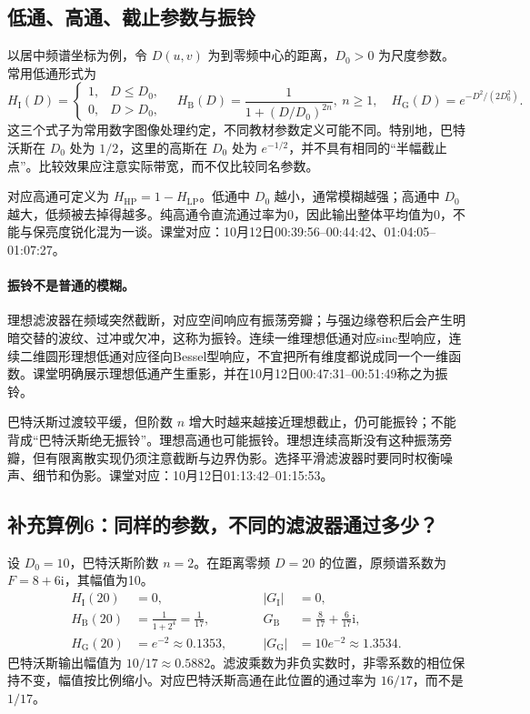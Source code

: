 \subsection{低通、高通、截止参数与振铃}
以居中频谱坐标为例，令 $D(u,v)$ 为到零频中心的距离，$D_0>0$ 为尺度参数。常用低通形式为
\[
H_{\mathrm I}(D)=\begin{cases}1,&D\leq D_0,\\0,&D>D_0,\end{cases}
\quad
H_{\mathrm B}(D)=\frac{1}{1+(D/D_0)^{2n}},\ n\geq1,
\quad
H_{\mathrm G}(D)=e^{-D^2/(2D_0^2)}.
\]
这三个式子为常用数字图像处理约定，不同教材参数定义可能不同。特别地，巴特沃斯在 $D_0$ 处为 $1/2$，这里的高斯在 $D_0$ 处为 $e^{-1/2}$，并不具有相同的“半幅截止点”。比较效果应注意实际带宽，而不仅比较同名参数。

对应高通可定义为 $H_{\mathrm{HP}}=1-H_{\mathrm{LP}}$。低通中 $D_0$ 越小，通常模糊越强；高通中 $D_0$ 越大，低频被去掉得越多。纯高通令直流通过率为0，因此输出整体平均值为0，不能与保亮度锐化混为一谈。课堂对应：10月12日00:39:56--00:44:42、01:04:05--01:07:27。

\paragraph{振铃不是普通的模糊。}
理想滤波器在频域突然截断，对应空间响应有振荡旁瓣；与强边缘卷积后会产生明暗交替的波纹、过冲或欠冲，这称为振铃。连续一维理想低通对应sinc型响应，连续二维圆形理想低通对应径向Bessel型响应，不宜把所有维度都说成同一个一维函数。课堂明确展示理想低通产生重影，并在10月12日00:47:31--00:51:49称之为振铃。

巴特沃斯过渡较平缓，但阶数 $n$ 增大时越来越接近理想截止，仍可能振铃；不能背成“巴特沃斯绝无振铃”。理想高通也可能振铃。理想连续高斯没有这种振荡旁瓣，但有限离散实现仍须注意截断与边界伪影。选择平滑滤波器时要同时权衡噪声、细节和伪影。课堂对应：10月12日01:13:42--01:15:53。

\subsection{补充算例6：同样的参数，不同的滤波器通过多少？}
设 $D_0=10$，巴特沃斯阶数 $n=2$。在距离零频 $D=20$ 的位置，原频谱系数为 $F=8+6\mathrm i$，其幅值为10。
\[
\begin{aligned}
H_{\mathrm I}(20)&=0,\qquad &|G_{\mathrm I}|&=0,\\
H_{\mathrm B}(20)&=\frac1{1+2^4}=\frac1{17},\qquad
& G_{\mathrm B}&=\frac8{17}+\frac6{17}\mathrm i,\\
H_{\mathrm G}(20)&=e^{-2}\approx0.1353,\qquad
& |G_{\mathrm G}|&=10e^{-2}\approx1.3534.
\end{aligned}
\]
巴特沃斯输出幅值为 $10/17\approx0.5882$。滤波乘数为非负实数时，非零系数的相位保持不变，幅值按比例缩小。对应巴特沃斯高通在此位置的通过率为 $16/17$，而不是 $1/17$。

